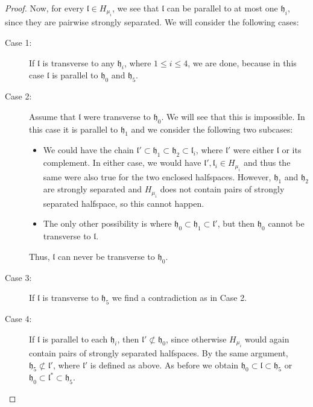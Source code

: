 \begin{proof}
  Now, for every \(\mathfrak{l} \in H_{\mu_i}\), we see that \(\mathfrak{l}\) can be parallel to at most one \(\mathfrak{h}_i\), since they are pairwise strongly separated. We will consider the following cases:
  \begin{description}
  \item[Case 1:] If \(\mathfrak{l}\) is transverse to any \(\mathfrak{h}_i\), where \(1 \leq i \leq 4\), we are done, because in this case \(\mathfrak{l}\) is parallel to \(\mathfrak{h}_0\) and \(\mathfrak{h}_5\).
  \item[Case 2:] Assume that \(\mathfrak{l}\) were transverse to \(\mathfrak{h}_0\). We will see that this is impossible. In this case it is parallel to \(\mathfrak{h}_1\) and we consider the following two subcases:
    \begin{itemize}
    \item We could have the chain \(\mathfrak{l}' \subset \mathfrak{h}_1 \subset \mathfrak{h}_2 \subset \mathfrak{l}_i\), where \(\mathfrak{l}'\) were either \(\mathfrak{l}\) or its complement. In either case, we would have \(\mathfrak{l}', \mathfrak{l}_i \in H_{\mu_i}\) and thus the same were also true for the two enclosed halfspaces. However, \(\mathfrak{h}_1\) and \(\mathfrak{h}_2\) are strongly separated and \(H_{\mu_i}\) does not contain pairs of strongly separated halfspace, so this cannot happen.
    \item The only other possibility is where \(\mathfrak{h}_0 \subset \mathfrak{h}_1 \subset \mathfrak{l}'\), but then \(\mathfrak{h}_0\) cannot be transverse to \(\mathfrak{l}\). 
    \end{itemize}
    Thus, \(\mathfrak{l}\) can never be transverse to \(\mathfrak{h}_0\). 
  \item[Case 3:] If \(\mathfrak{l}\) is transverse to \(\mathfrak{h}_5\) we find a contradiction as in Case 2.
  \item[Case 4:] If \(\mathfrak{l}\) is parallel to each \(\mathfrak{h}_i\), then \(\mathfrak{l}' \not\subset \mathfrak{h_0}\), since otherwise \(H_{\mu_i}\) would again contain pairs of strongly separated halfspaces. By the same argument, \(\mathfrak{h}_5 \not\subset \mathfrak{l}'\), where \(\mathfrak{l}'\) is defined as above. As before we obtain \(\mathfrak{h}_0 \subset \mathfrak{l} \subset \mathfrak{h}_5\) or \(\mathfrak{h}_0 \subset \mathfrak{l}^\ast \subset \mathfrak{h}_5\).
  \end{description}
\end{proof}

